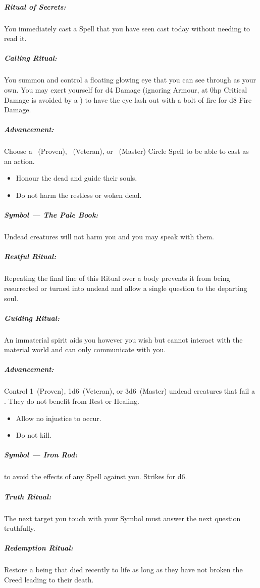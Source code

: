 \documentclass[itdr]{subfiles}
\begin{document}
\subparagraph{Ritual of Secrets:} You immediately cast a Spell that you have seen cast today without needing to read it.

\subparagraph{Calling Ritual:} You summon and control a floating glowing eye that you can see through as your own. You may exert yourself for d4 Damage (ignoring Armour, at 0hp Critical Damage is avoided by a ) to have the eye lash out with a bolt of fire for d8 Fire Damage.

\subparagraph{Advancement:} Choose a ~(Proven), ~(Veteran), or ~(Master) Circle Spell to be able to cast as an action.

\vspace{2ex}

{\em\begin{itemize}
		\item Honour the dead and guide their souls.
		\item Do not harm the restless or woken dead.
\end{itemize}}

\subparagraph{Symbol --- The Pale Book:} Undead creatures will not harm you and you may speak with them.

\subparagraph{Restful Ritual:} Repeating the final line of this Ritual over a body prevents it from being resurrected or turned into undead and allow a single question to the departing soul.

\subparagraph{Guiding Ritual:} An immaterial spirit aids you however you wish but cannot interact with the material world and can only communicate with you.

\subparagraph{Advancement:} Control 1~(Proven), 1d6~(Veteran), or 3d6~(Master) undead creatures that fail a . They do not benefit from Rest or Healing.

\vfill
\break

{\em\begin{itemize}
		\item Allow no injustice to occur.
		\item Do not kill.
\end{itemize}}

\subparagraph{Symbol --- Iron Rod:}  to avoid the effects of any Spell against you. Strikes for d6.

\subparagraph{Truth Ritual:} The next target you touch with your Symbol must answer the next question truthfully.

\subparagraph{Redemption Ritual:} Restore a being that died recently to life as long as they have not broken the Creed leading to their death.
\end{document}
